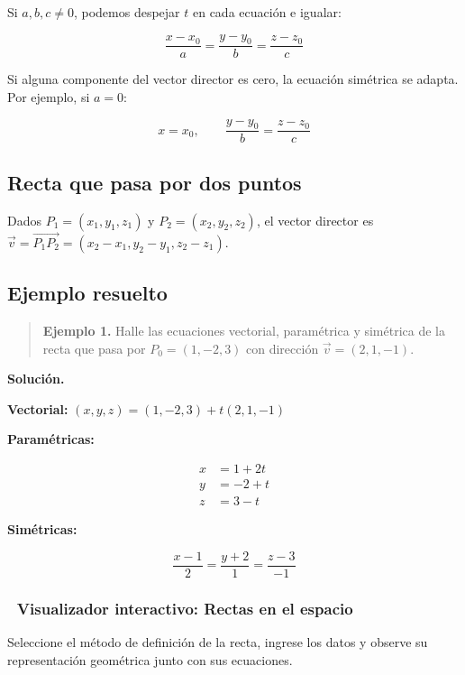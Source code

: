 \documentclass[
]{book}
\begin{document}
Si \(a, b, c \neq 0\), podemos despejar \(t\) en cada ecuación e igualar:

\[
\frac{x - x_0}{a} = \frac{y - y_0}{b} = \frac{z - z_0}{c}
\]

Si alguna componente del vector director es cero, la ecuación simétrica se adapta. Por ejemplo, si \(a = 0\):

\[
x = x_0, \qquad \frac{y - y_0}{b} = \frac{z - z_0}{c}
\]

\subsection{Recta que pasa por dos puntos}\label{recta-que-pasa-por-dos-puntos}

Dados \(P_1 = (x_1, y_1, z_1)\) y \(P_2 = (x_2, y_2, z_2)\), el vector director es \(\vec{v} = \overrightarrow{P_1 P_2} = (x_2 - x_1, y_2 - y_1, z_2 - z_1)\).

\subsection{Ejemplo resuelto}\label{ejemplo-resuelto-2}

\begin{quote}
\textbf{Ejemplo 1.} Halle las ecuaciones vectorial, paramétrica y simétrica de la recta que pasa por \(P_0 = (1, -2, 3)\) con dirección \(\vec{v} = (2, 1, -1)\).
\end{quote}

\textbf{Solución.}

\textbf{Vectorial:} \((x, y, z) = (1, -2, 3) + t(2, 1, -1)\)

\textbf{Paramétricas:}

\[
\begin{aligned}
x &= 1 + 2t \\
y &= -2 + t \\
z &= 3 - t
\end{aligned}
\]

\textbf{Simétricas:}

\[
\frac{x - 1}{2} = \frac{y + 2}{1} = \frac{z - 3}{-1}
\]

\subsubsection{🧮 Visualizador interactivo: Rectas en el espacio}\label{visualizador-interactivo-rectas-en-el-espacio}

Seleccione el método de definición de la recta, ingrese los datos y observe su representación geométrica junto con sus ecuaciones.
\end{document}
